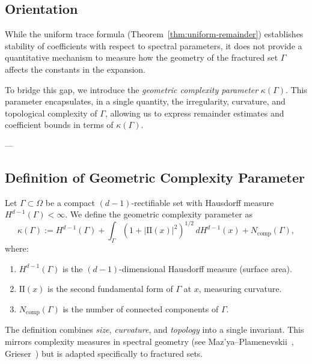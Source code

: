 \subsection*{Orientation}
While the uniform trace formula (Theorem~\ref{thm:uniform-remainder}) 
establishes stability of coefficients with respect to spectral parameters, 
it does not provide a quantitative mechanism 
to measure how the geometry of the fractured set $\Gamma$ 
affects the constants in the expansion.  

To bridge this gap, we introduce the \emph{geometric complexity parameter} 
$\kappa(\Gamma)$.  
This parameter encapsulates, in a single quantity, the 
irregularity, curvature, and topological complexity of $\Gamma$, 
allowing us to express remainder estimates and coefficient bounds 
in terms of $\kappa(\Gamma)$.

---

\subsection{Definition of Geometric Complexity Parameter}

\begin{definition}
\label{def:kappa}
Let $\Gamma \subset \Omega$ be a compact $(d-1)$-rectifiable set 
with Hausdorff measure $H^{d-1}(\Gamma) < \infty$.  
We define the geometric complexity parameter as
\[
\kappa(\Gamma) 
:= H^{d-1}(\Gamma) 
+ \int_\Gamma (1+|\mathrm{II}(x)|^2)^{1/2} \, dH^{d-1}(x)
+ N_{\mathrm{comp}}(\Gamma),
\]
where:
\begin{enumerate}
  \item $H^{d-1}(\Gamma)$ is the $(d-1)$-dimensional Hausdorff measure (surface area).
  \item $\mathrm{II}(x)$ is the second fundamental form of $\Gamma$ at $x$, 
  measuring curvature.
  \item $N_{\mathrm{comp}}(\Gamma)$ is the number of connected components of $\Gamma$.
\end{enumerate}
\end{definition}

\begin{remark}
The definition combines \emph{size}, \emph{curvature}, and \emph{topology} 
into a single invariant.  
This mirrors complexity measures in spectral geometry 
(see Maz'ya--Plamenevskii~\cite{MazyaPlamenevskii1980}, 
Grieser~\cite{Grieser2001}) 
but is adapted specifically to fractured sets.
\end{remark}

